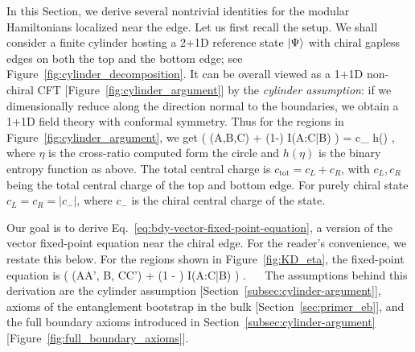 \documentclass[12pt, nofootinbib]{article}
\theoremstyle{plain}
\theoremstyle{assumption}
\theoremstyle{definition}
\theoremstyle{plain}
\theoremstyle{plain}
\theoremstyle{plain}
\theoremstyle{plain}
\theoremstyle{plain}
\def\ctot{c_{\mathrm{tot}}}
\def\({\left(}
\def\){\right)}
\begin{document}
In this Section, we derive several nontrivial identities for the modular Hamiltonians localized near the edge. Let us first recall the setup. We shall consider a finite cylinder hosting a 2+1D reference state $\left|\Psi\right\rangle$ with chiral gapless edges on both the top and the bottom edge; see Figure~\ref{fig:cylinder_decomposition}. It can be overall viewed as a 1+1D non-chiral CFT [Figure~\ref{fig:cylinder_argument}] by the \emph{cylinder assumption}: if we dimensionally reduce along the direction normal to the boundaries, we obtain a 1+1D field theory with conformal symmetry. Thus for the regions in Figure~\ref{fig:cylinder_argument}, we get
\be  \( \eta \hat \Delta(A,B,C) + (1-\eta) \hat I(A:C|B) \) \ket{\Psi } 
= { \ctot {} } h(\eta) \ket{\Psi}, \ee
where $\eta$ is the cross-ratio computed form the circle and $h(\eta)$ is the binary entropy function as above. The total central charge is $\ctot = c_L + c_R$, with $c_L,c_R$ being the total central charge of the top and bottom edge. For purely chiral state $c_L = c_R = |c_{-}|$, where $c_{-}$ is the chiral central charge of the state. 

Our goal is to derive Eq.~\eqref{eq:bdy-vector-fixed-point-equation}, a version of the vector fixed-point equation near the chiral edge. For the reader's convenience, we restate this below. For the regions shown in Figure~\ref{fig:KD_eta}, the fixed-point equation is
\be  
\(  \eta \hat \Delta(AA', B, CC') + (1 - \eta) \hat I(A:C|B) \)
\ket{\Psi} \propto \ket{\Psi}.
~~  \label{eq:chiral-fixed-point-equation}\ee
The assumptions behind this derivation are the cylinder assumption [Section~\ref{subsec:cylinder-argument}], axioms of the entanglement bootstrap in the bulk [Section~\ref{sec:primer_eb}], and the full boundary axioms introduced in Section~\ref{subsec:cylinder-argument} [Figure~\ref{fig:full_boundary_axioms}]. 

\cylindertovectorfixedpointeqn*
\end{document}
